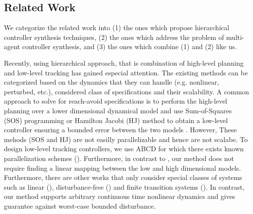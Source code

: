 \subsection{Related Work}

We categorize the related work into (1) the ones which propose hierarchical controller synthesis techniques, (2) the ones which address the problem of multi-agent controller synthesis, and (3) the ones which combine (1) and (2) like us.

Recently, using hierarchical approach, that is combination of high-level planning and low-level tracking has gained especial attention. The existing methods can be categorized based on the dynamics that they can handle (e.g. nonlinear, perturbed, etc.), considered class of specifications and their scalability. A common approach to solve for reach-avoid specifications is to perform the high-level planning over a lower dimensional dynamical model and use
Sum-of-Squares (SOS) programming or Hamilton Jacobi (HJ) method to obtain a low-level controller ensuring a bounded error between the two models \cite{herbert2017fastrack,DBLP:journals/corr/abs-1911-09773,singh2018robust}. However, These mehods (SOS and HJ) are not easilly parallelizable and hence are not scalabe. To design low-level tracking controllers, we use ABCD for which there exists known parallelization schemes (\cite{KhaledZ19pfaces}). Furthermore, in contrast to \cite{herbert2017fastrack,singh2018robust}, our method does not require finding a linear mapping between the low and high dimensional models. Furthermore, there are other works that only consider special classes of systems such as linear (\cite{fan2018controller,wongpiromsarn2012receding}), disturbance-free (\cite{tedrake2010lqr,fan2020fast}) and finite transition systems (\cite{Yang2017milp}). In contrast, our method supports arbitrary continuous time nonlinear dynamics and gives guarantee against worst-case bounded disturbance.
	

